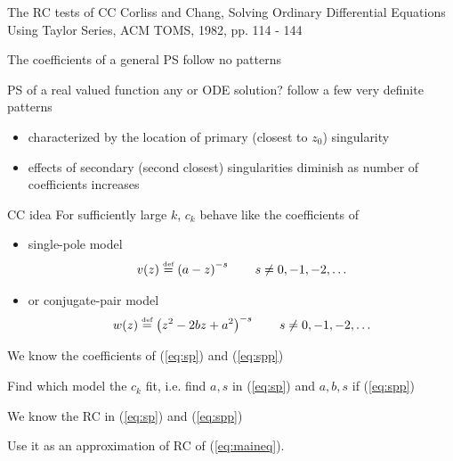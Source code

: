 \documentclass[11pt,svgnames,fleqn]{beamer}
\newcommand{\defeq}{\stackrel{\textup{\tiny def}}{=}}
\newcommand{\parbg}[1]{\left(  {#1} \right)}
\newcommand{\NC}[1]{{\color{red}#1}}
\begin{document}
\begin{frame}{The RC tests of CC}
{Corliss and Chang, Solving Ordinary Differential Equations 
  Using Taylor Series, ACM TOMS, 1982, pp. 114 - 144}

The coefficients of a general PS follow no patterns



  PS of a real valued function \NC{any or ODE solution?} follow a few very definite patterns
  \begin{itemize}
  \item  characterized by the
  location of primary (closest to $z_0$) singularity
  \item effects of secondary (second closest) singularities diminish as number of coefficients increases 
  \end{itemize}

\vspace{3mm}





  

\end{frame}

\begin{frame}{CC idea}
 For sufficiently large $k$, $c_k$  behave like the coefficients of
  \begin{itemize}
  \item single-pole model 
\begin{align}
 v(z) \defeq \parbg{a-z}^{-s}  \qquad s \neq 0, -1, -2, \ldots 
 \label{eq:sp}
 \end{align}
 \item or conjugate-pair model 
 \begin{align}
 w(z) \defeq \parbg{z^2 - 2 b z + a^2}^{-s} \qquad s \neq 0, -1, -2, \ldots
 \label{eq:spp}
 \end{align}
\end{itemize}

We know the coefficients of  (\ref{eq:sp}) and (\ref{eq:spp})

Find which model the $c_k$ fit, i.e. find
 $a, s$ in (\ref{eq:sp}) and $a,b,s$ if (\ref{eq:spp})

We know the RC in (\ref{eq:sp}) and (\ref{eq:spp})

Use it as an approximation of RC of (\ref{eq:maineq}).

\end{frame}
\end{document}
